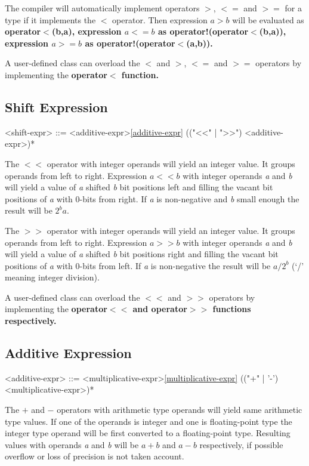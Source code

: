 \documentclass[a4paper,oneside,11pt]{article}
\begin{document}
The compiler will automatically implement operators $>$, $<=$ and $>=$ for a type if it implements the $<$ operator.
Then expression $a > b$ will be evaluated as \bf{operator$<$(b,a)},
expression $a <= b$ as \bf{operator!(operator$<$(b,a))},
expression $a >= b$ as \bf{operator!(operator$<$(a,b))}.

A user-defined class can overload the $<$ and $>$, $<=$ and $>=$ operators by implementing the \bf{operator$<$} function.

\subsection{Shift Expression}

\begin{grammar}
\label{shift-expr}<shift-expr> ::= <additive-expr>\ref{additive-expr} (("<<" | ">>") <additive-expr>)*
\end{grammar}

The $<<$ operator with integer operands will yield an integer value. It groups operands from left to right.
Expression $a << b$ with integer operands \emph{a} and \emph{b} will yield a value of \emph{a} shifted \emph{b} bit positions left and
filling the vacant bit positions of \emph{a} with 0-bits from right.
If \emph{a} is non-negative and \emph{b} small enough the result will be $2^ba$.

The $>>$ operator with integer operands will yield an integer value. It groups operands from left to right.
Expression $a >> b$ with integer operands \emph{a} and \emph{b} will yield a value of \emph{a} shifted \emph{b} bit positions right and
filling the vacant bit positions of \emph{a} with 0-bits from left.
If \emph{a} is non-negative the result will be $a / 2^b$ (`/' meaning integer division).

A user-defined class can overload the $<<$ and $>>$ operators by implementing the \bf{operator$<<$} and \bf{operator$>>$} functions respectively.

\subsection{Additive Expression}

\begin{grammar}
\label{additive-expr}<additive-expr> ::= <multiplicative-expr>\ref{multiplicative-expr} (("+" | '-') <multiplicative-expr>)*
\end{grammar}

The $+$ and $-$ operators with arithmetic type operands will yield same arithmetic type values.
If one of the operands is integer and one is floating-point type the integer type operand will be first converted to a floating-point type.
Resulting values with operands \emph{a} and \emph{b} will be $a + b$ and $a - b$ respectively,
if possible overflow or loss of precision is not taken account.
\end{document}
